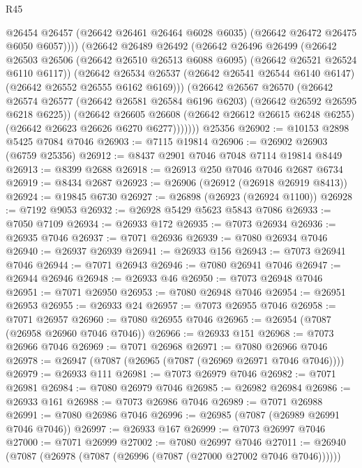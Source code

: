 \begin{lexlean}{R45}
\begin{coremodule}
{                @26454
                @26457
                (@26642 @26461 @26464 @6028 @6035)
                (@26642 @26472 @26475 @6050 @6057))))
          (@26642
            @26489
            @26492
            (@26642
              @26496
              @26499
              (@26642
                @26503
                @26506
                (@26642 @26510 @26513 @6088 @6095)
                (@26642 @26521 @26524 @6110 @6117))
              (@26642
                @26534
                @26537
                (@26642 @26541 @26544 @6140 @6147)
                (@26642 @26552 @26555 @6162 @6169)))
            (@26642
              @26567
              @26570
              (@26642
                @26574
                @26577
                (@26642 @26581 @26584 @6196 @6203)
                (@26642 @26592 @26595 @6218 @6225))
              (@26642
                @26605
                @26608
                (@26642 @26612 @26615 @6248 @6255)
                (@26642 @26623 @26626 @6270 @6277)))))))
    @25356
@26902 := @10153 @2898 @5425 @7084 @7046
@26903 := @7115 @19814
@26906 := @26902 @26903 (@6759 @25356)
@26912 := @8437 @2901 @7046 @7048 @7114 @19814 @8449
@26913 := @8399 @2688
@26918 := @26913 @250 @7046 @7046 @2687 @6734
@26919 := @8434 @2687
@26923 := @26906 (@26912 (@26918 @26919 @8413))
@26924 := @19845 @6730
@26927 := @26898 (@26923 (@26924 @1100))
@26928 := @7192 @9053
@26932 := @26928 @5429 @5623 @5843 @7086
@26933 := @7050 @7109
@26934 := @26933 @172
@26935 := @7073 @26934
@26936 := @26935 @7046
@26937 := @7071 @26936
@26939 := @7080 @26934 @7046
@26940 := @26937 @26939
@26941 := @26933 @156
@26943 := @7073 @26941 @7046
@26944 := @7071 @26943
@26946 := @7080 @26941 @7046
@26947 := @26944 @26946
@26948 := @26933 @46
@26950 := @7073 @26948 @7046
@26951 := @7071 @26950
@26953 := @7080 @26948 @7046
@26954 := @26951 @26953
@26955 := @26933 @24
@26957 := @7073 @26955 @7046
@26958 := @7071 @26957
@26960 := @7080 @26955 @7046
@26965 := @26954 (@7087 (@26958 @26960 @7046 @7046))
@26966 := @26933 @151
@26968 := @7073 @26966 @7046
@26969 := @7071 @26968
@26971 := @7080 @26966 @7046
@26978 := @26947 (@7087 (@26965 (@7087 (@26969 @26971 @7046 @7046))))
@26979 := @26933 @111
@26981 := @7073 @26979 @7046
@26982 := @7071 @26981
@26984 := @7080 @26979 @7046
@26985 := @26982 @26984
@26986 := @26933 @161
@26988 := @7073 @26986 @7046
@26989 := @7071 @26988
@26991 := @7080 @26986 @7046
@26996 := @26985 (@7087 (@26989 @26991 @7046 @7046))
@26997 := @26933 @167
@26999 := @7073 @26997 @7046
@27000 := @7071 @26999
@27002 := @7080 @26997 @7046
@27011 := @26940 (@7087 (@26978 (@7087 (@26996 (@7087 (@27000 @27002 @7046 @7046))))))
}
\end{coremodule}
\end{lexlean}

